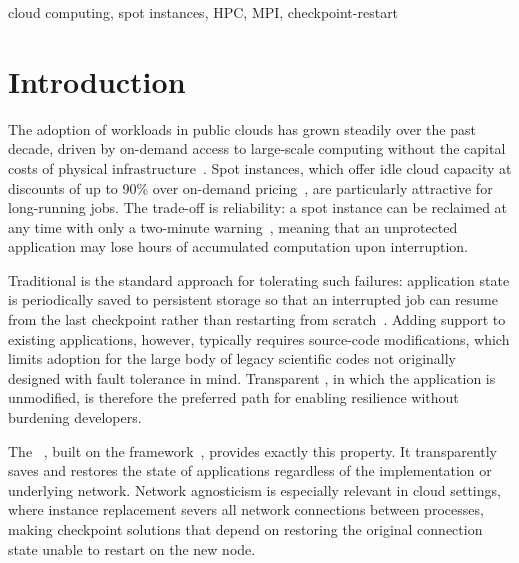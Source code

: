 \documentclass[conference]{IEEEtran}
\begin{document}
\begin{IEEEkeywords}
cloud computing, spot instances, HPC, MPI, checkpoint-restart
\end{IEEEkeywords}

\glsresetall

\section{Introduction}
\label{sec:introduction}

The adoption of \HPC workloads in public clouds has grown steadily over the past
decade, driven by on-demand access to large-scale computing without the capital costs
of physical infrastructure~\cite{netto2018hpccloud,mell2011nist}. Spot instances,
which offer idle cloud capacity at discounts of up to 90\% over on-demand
pricing~\cite{aws2018spot}, are particularly attractive for long-running \HPC jobs.
The trade-off is reliability: a spot instance can be reclaimed at any time with only a
two-minute warning~\cite{aws2026spot_termination}, meaning that an unprotected \MPI
application may lose hours of accumulated computation upon interruption.

Traditional \CR is the standard approach for tolerating such
failures: application state is periodically saved to persistent storage so that an
interrupted job can resume from the last checkpoint rather than restarting from
scratch~\cite{hargrove2006blcr,moody2010scr}. Adding \CR support to existing \MPI
applications, however, typically requires source-code modifications, which limits
adoption for the large body of legacy scientific codes not originally designed with
fault tolerance in mind. Transparent \CR, in which the application is unmodified,
is therefore the preferred path for enabling resilience without burdening developers.

The \MANA~\cite{garg2019mana}, built on the \DMTCP framework~\cite{ansel2009dmtcp},
provides exactly this property. It transparently saves and restores the state of \MPI
applications regardless of the \MPI implementation or underlying network. Network
agnosticism is especially relevant in cloud settings, where instance replacement severs
all network connections between processes, making checkpoint solutions that depend on
restoring the original connection state unable to restart on the new node.
\end{document}
